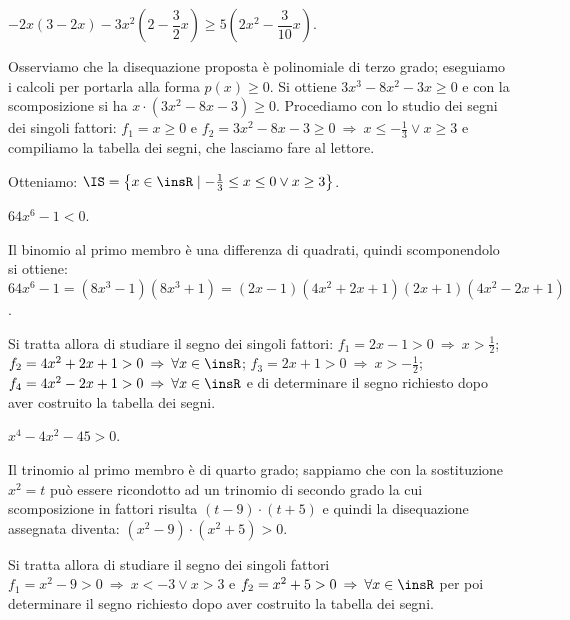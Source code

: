 \begin{exrig}
\begin{esempio}
$-2x(3-2x)-3x^2\left(2-\dfrac 3 2x\right)\ge 5\left(2x^2-\dfrac 3{10}x\right)$.

Osserviamo che la disequazione proposta è polinomiale di terzo grado; eseguiamo i calcoli per portarla alla forma $p(x)\ge 0$. Si ottiene $3x^3-8x^2-3x\ge 0$ e con la scomposizione si ha $x\cdot (3x^2-8x-3)\ge 0$. Procediamo con lo studio dei segni dei singoli fattori: $f_1=x\ge 0$ e $f_2=3x^2-8x-3\ge 0 \:\Rightarrow\: x\le -\frac 1 3\vee x\ge 3$ e compiliamo la tabella dei segni, che lasciamo fare al lettore.
\begin{center}
 
\end{center}
Otteniamo: $\IS=\left\{x\in \insR \mid -\frac 1 3\le x\le 0\vee x\ge 3\right\}$.
\end{esempio}

\begin{esempio}
$64x^6-1<0$.

Il binomio al primo membro è una differenza di quadrati, quindi scomponendolo si ottiene: $64x^6-1=(8x^3-1)(8x^3+1)=(2x-1)(4x^2+2x+1)(2x+1)(4x^2-2x+1)$.

Si tratta allora di studiare il segno dei singoli fattori: $f_1=2x-1>0\:\Rightarrow\: x>\frac 1 2$; $f_2=4x^2+2x+1>0\:\Rightarrow\: \forall x\in \insR$; $f_3=2x+1>0\:\Rightarrow\: x>-\frac 1 2$; $f_4=4x^2-2x+1>0\:\Rightarrow\: \forall x\in \insR$ e di determinare il segno richiesto dopo aver costruito la tabella dei segni.
\end{esempio}

\begin{esempio}
$x^4-4x^2-45>0$.

Il trinomio al primo membro è di quarto grado; sappiamo che con la sostituzione $x^2=t$ può essere ricondotto ad un trinomio di secondo grado la cui scomposizione in fattori risulta $(t-9)\cdot (t+5)$ e quindi la disequazione assegnata diventa: $(x^2-9)\cdot (x^2+5)>0$.

Si tratta allora di studiare il segno dei singoli fattori $f_1=x^2-9>0\:\Rightarrow\: x<-3\vee x>3$ e $f_2=x^2+5>0\:\Rightarrow\: \forall x\in \insR$ per poi determinare il segno richiesto dopo aver costruito la tabella dei segni.
\end{esempio}
\end{exrig}
\vspazio\ovalbox{\risolvii \ref{ese:4.27}, \ref{ese:4.28}, \ref{ese:4.29}, \ref{ese:4.30}, \ref{ese:4.31}, \ref{ese:4.32}, \ref{ese:4.33}, \ref{ese:4.34}, \ref{ese:4.35}, \ref{ese:4.36}, \ref{ese:4.37}, \ref{ese:4.38}, \ref {ese:4.39},}

